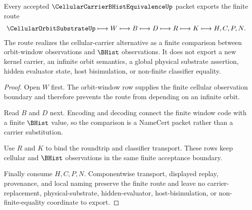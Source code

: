 \begin{theorem}
\label{thm:cellular-carrier-bhist-equivalence-route}
Every accepted $\CellularCarrierBHistEquivalenceUp$ packet exports the finite route
$$
\CellularOrbitSubstrateUp
\longmapsto
W
\longmapsto
B
\longmapsto
D
\longmapsto
R
\longmapsto
K
\longmapsto
H,C,P,N .
$$
The route realizes the cellular-carrier alternative as a finite comparison between orbit-window observations and $\BHist$ observations. It does not export a new kernel carrier, an infinite orbit semantics, a global physical substrate assertion, hidden evaluator state, host bisimulation, or non-finite classifier equality.
\end{theorem}
\begin{proof}
Open $W$ first. The orbit-window row supplies the finite cellular observation boundary and therefore prevents the route from depending on an infinite orbit.

Read $B$ and $D$ next. Encoding and decoding connect the finite window code with a finite $\BHist$ value, so the comparison is a NameCert packet rather than a carrier substitution.

Use $R$ and $K$ to bind the roundtrip and classifier transport. These rows keep cellular and $\BHist$ observations in the same finite acceptance boundary.

Finally consume $H,C,P,N$. Componentwise transport, displayed replay, provenance, and local naming preserve the finite route and leave no carrier-replacement, physical-substrate, hidden-evaluator, host-bisimulation, or non-finite-equality coordinate to export.
\end{proof}




